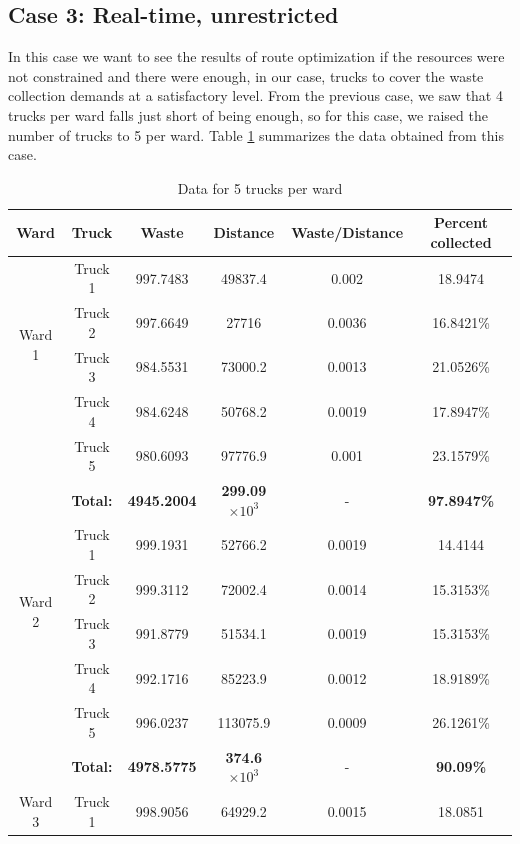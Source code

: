 \documentclass[12pt]{article}
\begin{document}
\subsection*{Case 3: Real-time, unrestricted}

In this case we want to see the results of route optimization if the resources were not constrained and there were enough, in our case, trucks to cover the waste collection demands at a satisfactory level. From the previous case, we saw that 4 trucks per ward falls just short of being enough, so for this case, we raised the number of trucks to 5 per ward. Table \ref{tab3} summarizes the data obtained from this case.

\begin{table}[H]
    \centering
    \caption{ Data for 5 trucks per ward} \label{tab3}
    \vspace*{0.3cm}
    \begin{tabular}{|c|c|c|c|c|c|}
        \hline Ward & Truck & Waste & Distance & Waste/Distance & Percent collected \\
        \hline \multirow{4}{*}{Ward 1} & Truck 1 &997.7483  &49837.4  &0.002  &18.9474 \\
        \cline{2-6}& Truck 2 &997.6649&27716&0.0036&16.8421\%\\        
        \cline{2-6}& Truck 3 &984.5531&73000.2&0.0013&21.0526\%\\        
        \cline{2-6}& Truck 4 &984.6248&50768.2&0.0019&17.8947\%\\
        \cline{2-6}& Truck 5 &980.6093&97776.9&0.001&23.1579\%\\
        \hline &\textbf{Total:} &\textbf{4945.2004} &\textbf{299.09$\times10^3$} &- &\textbf{97.8947\%}\\
        \hline \multirow{4}{*}{Ward 2} & Truck 1 &999.1931  &52766.2  &0.0019  &14.4144 \\
        \cline{2-6}& Truck 2 &999.3112&72002.4&0.0014&15.3153\%\\        
        \cline{2-6}& Truck 3 &991.8779&51534.1&0.0019&15.3153\%\\        
        \cline{2-6}& Truck 4 &992.1716&85223.9&0.0012&18.9189\%\\      
        \cline{2-6}& Truck 5 &996.0237&113075.9&0.0009&26.1261\%\\
        \hline &\textbf{Total:} &\textbf{4978.5775} &\textbf{374.6$\times10^3$} &- &\textbf{90.09\%}\\     
        \hline \multirow{4}{*}{Ward 3} & Truck 1 &998.9056  &64929.2  &0.0015  &18.0851 \\

\end{tabular}
\end{table}
\end{document}
